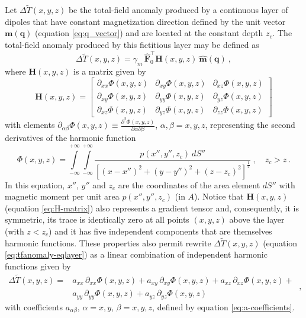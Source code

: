 Let $\Delta \tilde{T}(x, y, z)$ be the total-field anomaly produced by a 
continuous layer of dipoles that have constant magnetization direction defined by
the unit vector $\mathbf{m}(\mathbf{q})$ (equation \ref{eq:q_vector})
and are located at the constant depth $z_{c}$. The total-field anomaly produced
by this fictitious layer may be defined as
\begin{equation}
\Delta \tilde{T}(x, y, z) = \gamma_{m} \, \hat{\mathbf{F}}_{0}^{\top} \mathbf{H}(x, y, z) \: 
\hat{\mathbf{m}}(\mathbf{q}) \: ,
\label{eq:tfanomaly-eqlayer}
\end{equation}
where $\mathbf{H}(x, y, z)$ is a matrix given by
\begin{equation}
	\mathbf{H}(x, y, z) = \begin{bmatrix}
		\partial_{xx} \Phi(x, y, z) & 
		\partial_{xy} \Phi(x, y, z) &
		\partial_{xz} \Phi(x, y, z) \\
		\partial_{xy} \Phi(x, y, z) & 
		\partial_{yy} \Phi(x, y, z) &
		\partial_{yz} \Phi(x, y, z) \\
		\partial_{xz} \Phi(x, y, z) & 
		\partial_{yz} \Phi(x, y, z) &
		\partial_{zz} \Phi(x, y, z)
	\end{bmatrix}
	\label{eq:H-matrix}
\end{equation}
with elements
$\partial_{\alpha\beta} \Phi(x, y, z) \equiv 
\frac{\partial^{2} \Phi(x, y, z)}{\partial \alpha \partial \beta}$, 
$\alpha, \beta = x, y, z$, representing the second derivatives of the harmonic
function
\begin{equation}
	\Phi(x, y, z) = \int\limits_{-\infty}^{+\infty}\int\limits_{-\infty}^{+\infty}
	\frac{p(x'', y'', z_{c}) \: dS''}
	{\left[ (x-x'')^2 + (y-y'')^2 + (z-z_{c})^2 \right]^{\frac{1}{2}}} \: ,
	\quad z_{c} > z \: .
	\label{eq:Phi-surface-integral}
\end{equation}
In this equation, $x''$, $y''$ and $z_{c}$ are the coordinates 
of the area element $dS''$ with magnetic moment per unit area
$p(x'', y'', z_{c})$ (in $A$).
Notice that $\mathbf{H}(x, y, z)$ (equation \ref{eq:H-matrix}) also represents
a gradient tensor \citep{pedersen_rasmussen1990} and, consequently, it is symmetric, 
its trace is identically zero at all points $(x, y, z)$ above the layer (with $z < z_{c}$) 
and it has five independent components that are themselves harmonic functions.
These properties also permit rewrite $\Delta \tilde{T}(x, y, z)$ 
(equation \ref{eq:tfanomaly-eqlayer}) as a linear combination of independent
harmonic functions given by
\begin{equation}
\begin{split}
\Delta \tilde{T}(x, y, z) = 
&a_{xx} \, \partial_{xx} \Phi(x, y, z) + 
a_{xy} \, \partial_{xy} \Phi(x, y, z) + 
a_{xz} \, \partial_{xz} \Phi(x, y, z) + \\
&a_{yy} \, \partial_{yy} \Phi(x, y, z) + 
a_{yz} \, \partial_{yz} \Phi(x, y, z)
\end{split} \: ,
\label{eq:tfanomaly-eqlayer-alternative}
\end{equation}
with coefficients $a_{\alpha\beta}$, $\alpha = x, y$, $\beta = x, y, z$, defined by
equation \ref{eq:a-coefficients}.

